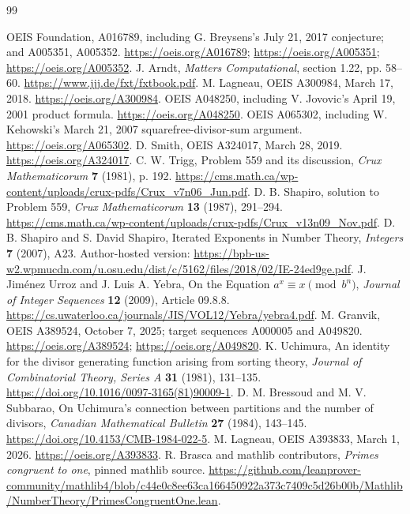 \documentclass[11pt]{article}
\begin{document}
\begin{thebibliography}{99}
\raggedright
{} OEIS Foundation, A016789, including G. Breysens's
July 21, 2017 conjecture; and A005351, A005352.
\url{https://oeis.org/A016789};
\url{https://oeis.org/A005351}; \url{https://oeis.org/A005352}.
 J. Arndt, \emph{Matters Computational}, section 1.22,
pp. 58--60. \url{https://www.jjj.de/fxt/fxtbook.pdf}.
 M. Lagneau, OEIS A300984, March 17, 2018.
\url{https://oeis.org/A300984}.
 OEIS A048250, including V. Jovovic's April 19, 2001
product formula. \url{https://oeis.org/A048250}.
 OEIS A065302, including W. Kehowski's March 21, 2007
squarefree-divisor-sum argument. \url{https://oeis.org/A065302}.
 D. Smith, OEIS A324017, March 28, 2019.
\url{https://oeis.org/A324017}.
 C. W. Trigg, Problem 559 and its discussion,
\emph{Crux Mathematicorum} \textbf{7} (1981), p. 192.
\url{https://cms.math.ca/wp-content/uploads/crux-pdfs/Crux_v7n06_Jun.pdf}.
 D. B. Shapiro, solution to Problem 559,
\emph{Crux Mathematicorum} \textbf{13} (1987), 291--294.
\url{https://cms.math.ca/wp-content/uploads/crux-pdfs/Crux_v13n09_Nov.pdf}.
 D. B. Shapiro and S. David Shapiro,
Iterated Exponents in Number Theory, \emph{Integers} \textbf{7} (2007), A23.
Author-hosted version:
\url{https://bpb-us-w2.wpmucdn.com/u.osu.edu/dist/c/5162/files/2018/02/IE-24ed9ge.pdf}.
 J. Jim\'enez Urroz and J. Luis A. Yebra,
On the Equation $a^x\equiv x\pmod{b^n}$,
\emph{Journal of Integer Sequences} \textbf{12} (2009), Article 09.8.8.
\url{https://cs.uwaterloo.ca/journals/JIS/VOL12/Yebra/yebra4.pdf}.
 M. Granvik, OEIS A389524, October 7, 2025;
target sequences A000005 and A049820.
\url{https://oeis.org/A389524}; \url{https://oeis.org/A049820}.
 K. Uchimura, An identity for the divisor generating
function arising from sorting theory,
\emph{Journal of Combinatorial Theory, Series A} \textbf{31} (1981), 131--135.
\url{https://doi.org/10.1016/0097-3165(81)90009-1}.
 D. M. Bressoud and M. V. Subbarao,
On Uchimura's connection between partitions and the number of divisors,
\emph{Canadian Mathematical Bulletin} \textbf{27} (1984), 143--145.
\url{https://doi.org/10.4153/CMB-1984-022-5}.
 M. Lagneau, OEIS A393833, March 1, 2026.
\url{https://oeis.org/A393833}.
 R. Brasca and mathlib contributors,
\emph{Primes congruent to one}, pinned mathlib source.
\url{https://github.com/leanprover-community/mathlib4/blob/c44e0c8ee63ca166450922a373c7409c5d26b00b/Mathlib/NumberTheory/PrimesCongruentOne.lean}.
\end{thebibliography}
\end{document}
